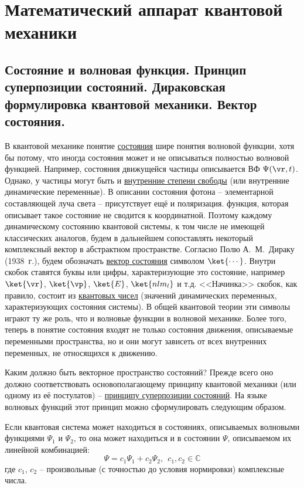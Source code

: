 \chapter{Математический аппарат квантовой механики}

\begin{sloppypar}
  \section{Состояние и волновая функция. Принцип суперпозиции состояний. Дираковская формулировка квантовой механики. Вектор состояния.}
\end{sloppypar}

В квантовой механике понятие \underline{состояния} шире понятия волновой функции, хотя бы потому, что иногда состояния может и не описываться полностью волновой функцией. Например, состояния движущейся частицы описывается ВФ $\Psi(\vr, t)$. Однако, у частицы могут быть и \underline{внутренние степени свободы} (или внутренние динамические переменные). В описании состояния фотона -- элементарной составляющей луча света -- присутствует ещё и поляризация. функция, которая описывает такое состояние не сводится к координатной. Поэтому каждому динамическому состоянию квантовой системы, к том числе не имеющей классических аналогов, будем в дальнейшем сопоставлять некоторый комплексный вектор в абстрактном пространстве. Согласно Полю А.~М.~Дираку (1938~г.), будем обозначать \underline{вектор состояния} символом $\ket{\cdots}$. Внутри скобок ставятся буквы или цифры, характеризующие это состояние, например $\ket{\vr}$, $\ket{\vp}$, $\ket{E}$, $\ket{nlm_l}$ и т.д. <<Начинка>> скобок, как правило, состоит из \underline{квантовых чисел} (значений динамических переменных, характеризующих состояния системы). В общей квантовой теории эти символы играют ту же роль, что и волновые функции в волновой механике. Более того, теперь в понятие состояния входят не только состояния движения, описываемые переменными пространства, но и они могут зависеть от всех внутренних переменных, не относящихся к движению.

Каким должно быть векторное пространство состояний? Прежде всего оно должно соответствовать основополагающему принципу квантовой механики (или одному из её постулатов) -- \underline{принципу суперпозиции состояний}. На языке волновых функций этот принцип можно сформулировать следующим образом.
%
\begin{stmt}
Если квантовая система может находиться в состояниях, описываемых волновыми функциями $\Psi_1$ и $\Psi_2$, то она может находиться и в состоянии $\Psi$, описываемом их линейной комбинацией:
$$
\Psi = c_1 \Psi_1 + c_2 \Psi_2, ~~c_1, c_2 \in \mathbb{C}
$$%
%
где $c_1$, $c_2$ -- произвольные (с точностью до условия нормировки) комплексные числа.
\end{stmt}

